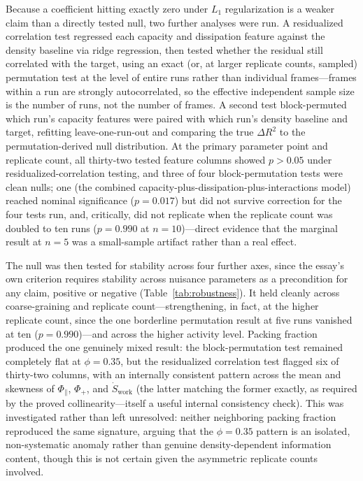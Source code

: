 \documentclass[11pt]{article}
\begin{document}
Because a coefficient hitting exactly zero under $L_1$ regularization is a weaker claim than a directly tested null, two further analyses were run. A residualized correlation test regressed each capacity and dissipation feature against the density baseline via ridge regression, then tested whether the residual still correlated with the target, using an exact (or, at larger replicate counts, sampled) permutation test at the level of entire runs rather than individual frames---frames within a run are strongly autocorrelated, so the effective independent sample size is the number of runs, not the number of frames. A second test block-permuted which run's capacity features were paired with which run's density baseline and target, refitting leave-one-run-out and comparing the true $\Delta R^2$ to the permutation-derived null distribution. At the primary parameter point and replicate count, all thirty-two tested feature columns showed $p>0.05$ under residualized-correlation testing, and three of four block-permutation tests were clean nulls; one (the combined capacity-plus-dissipation-plus-interactions model) reached nominal significance ($p=0.017$) but did not survive correction for the four tests run, and, critically, did not replicate when the replicate count was doubled to ten runs ($p=0.990$ at $n=10$)---direct evidence that the marginal result at $n=5$ was a small-sample artifact rather than a real effect.

The null was then tested for stability across four further axes, since the essay's own criterion requires stability across nuisance parameters as a precondition for any claim, positive or negative (Table~\ref{tab:robustness}). It held cleanly across coarse-graining and replicate count---strengthening, in fact, at the higher replicate count, since the one borderline permutation result at five runs vanished at ten ($p=0.990$)---and across the higher activity level. Packing fraction produced the one genuinely mixed result: the block-permutation test remained completely flat at $\phi=0.35$, but the residualized correlation test flagged six of thirty-two columns, with an internally consistent pattern across the mean and skewness of $\Phi_{\parallel}$, $\Phi_{+}$, and $\dot S_{\text{work}}$ (the latter matching the former exactly, as required by the proved collinearity---itself a useful internal consistency check). This was investigated rather than left unresolved: neither neighboring packing fraction reproduced the same signature, arguing that the $\phi=0.35$ pattern is an isolated, non-systematic anomaly rather than genuine density-dependent information content, though this is not certain given the asymmetric replicate counts involved.
\end{document}
